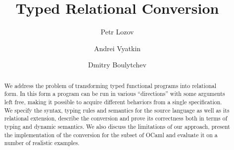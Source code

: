 \documentclass{llncs}
\begin{document}
\mainmatter

\title{Typed Relational Conversion}

\author{
  Petr Lozov \and Andrei Vyatkin \and Dmitry Boulytchev
}



\maketitle

\begin{abstract}
We address the problem of transforming typed functional programs into relational form. 
In this form a program can be run in various ``directions'' with some arguments left free, 
making it possible to acquire different behaviors from a single specification. We specify the 
syntax, typing rules and semantics for the source language as well as its relational extension, 
describe the conversion and prove its correctness both in terms of typing and dynamic semantics. 
We also discuss the limitations of our approach, present the implementation of the conversion for 
the subset of OCaml and evaluate it on a number of realistic examples.
\end{abstract}



%
%
\end{document}
